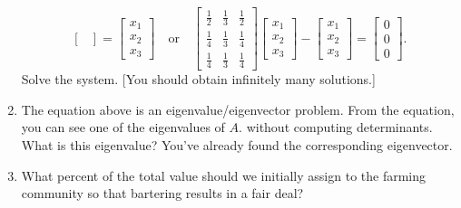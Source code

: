 \begin{problem}
\begin{enumerate}
$$\begin{bmatrix}
\end{bmatrix}
=
\begin{bmatrix}
 x_1\\x_2\\x_3
\end{bmatrix}
 \quad
\text{or}
\quad 
\begin{bmatrix}
   \frac{1}{2}& \frac{1}{3}& \frac{1}{2}\\
   \frac{1}{4}& \frac{1}{3}& \frac{1}{4}\\
   \frac{1}{4}& \frac{1}{3}& \frac{1}{4}
  \end{bmatrix}
\begin{bmatrix}
 x_1\\x_2\\x_3
\end{bmatrix}
-
\begin{bmatrix}
 x_1\\x_2\\x_3
\end{bmatrix}
=
\begin{bmatrix}
 0\\0\\0
\end{bmatrix}.
$$  
Solve the system. [You should obtain infinitely many solutions.]
\item The equation above is an eigenvalue/eigenvector problem.  From the equation, you can see one of the eigenvalues of $A$. without computing determinants.  What is this eigenvalue? You've already found the corresponding eigenvector. 
\item What percent of the total value should we initially assign to the farming community so that bartering results in a fair deal?
\end{enumerate}
\end{problem}















